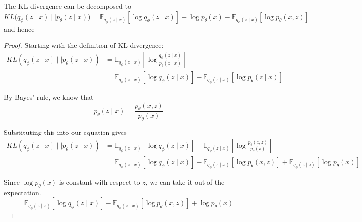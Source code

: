 \documentclass{article}
\begin{document}
  \begin{theorem}
    \label{thm:log-likelihood-vs-conditional-entropy}
    The KL divergence can be decomposed to 
    \begin{equation}
      KL \big( q_\phi (z \mid x) \mid\mid p_{\theta} (z \mid x) \big) = \mathbb{E}_{q_\phi(z \mid x)} [ \log q_{\phi} (z \mid x)] + \log p_{\theta} (x) - \mathbb{E}_{q_{\phi} (z \mid x)} [\log p_{\theta} (x, z)]
    \end{equation}
    and hence 
  \end{theorem}
  \begin{proof}
    Starting with the definition of KL divergence:
    \begin{align}
      KL(q_\phi(z \mid x) \mid\mid p_\theta(z \mid x)) &= \mathbb{E}_{q_\phi(z \mid x)}\left[\log \frac{q_\phi(z \mid x)}{p_\theta(z \mid x)}\right] \\
      &= \mathbb{E}_{q_\phi(z \mid x)}[\log q_\phi(z \mid x)] - \mathbb{E}_{q_\phi(z \mid x)}[\log p_\theta(z \mid x)]
    \end{align}

    By Bayes' rule, we know that
    \begin{equation}
      p_\theta(z \mid x) = \frac{p_\theta(x, z)}{p_\theta(x)}
    \end{equation}

    Substituting this into our equation gives 
    \begin{align}
      KL(q_\phi(z \mid x) \mid\mid p_\theta(z \mid x)) &= \mathbb{E}_{q_\phi(z \mid x)}[\log q_\phi(z \mid x)] - \mathbb{E}_{q_\phi(z \mid x)}\left[\log \frac{p_\theta(x, z)}{p_\theta(x)}\right] \\
      &= \mathbb{E}_{q_\phi(z \mid x)}[\log q_\phi(z \mid x)] - \mathbb{E}_{q_\phi(z \mid x)}[\log p_\theta(x, z)] + \mathbb{E}_{q_\phi(z \mid x)}[\log p_\theta(x)]
    \end{align}

    Since $\log p_\theta(x)$ is constant with respect to $z$, we can take it out of the expectation. 
    \begin{equation}
      \mathbb{E}_{q_\phi(z \mid x)}[\log q_\phi(z \mid x)] - \mathbb{E}_{q_\phi(z \mid x)}[\log p_\theta(x, z)] + \log p_\theta(x)
    \end{equation}
  \end{proof}
\end{document}
